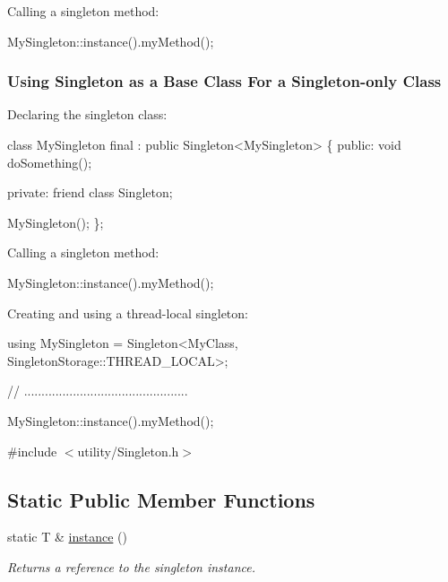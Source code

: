 Calling a singleton method\+: 
\begin{DoxyCode}
MySingleton::instance().myMethod();
\end{DoxyCode}
\hypertarget{classdg_1_1deepcore_1_1_singleton_inherit}{}\subsubsection{Using Singleton as a Base Class For a Singleton-\/only Class}\label{classdg_1_1deepcore_1_1_singleton_inherit}
Declaring the singleton class\+: 
\begin{DoxyCode}
\textcolor{keyword}{class }MySingleton final : \textcolor{keyword}{public} Singleton<MySingleton>
\{
\textcolor{keyword}{public}:
    \textcolor{keywordtype}{void} doSomething();

\textcolor{keyword}{private}:
    \textcolor{keyword}{friend} \textcolor{keyword}{class }Singleton;

    MySingleton();
\};
\end{DoxyCode}


Calling a singleton method\+: 
\begin{DoxyCode}
MySingleton::instance().myMethod();
\end{DoxyCode}


Creating and using a thread-\/local singleton\+: 
\begin{DoxyCode}
\textcolor{keyword}{using} MySingleton = Singleton<MyClass, SingletonStorage::THREAD\_LOCAL>;

\textcolor{comment}{// ...............................................}

MySingleton::instance().myMethod();
\end{DoxyCode}
 

{\ttfamily \#include $<$utility/\+Singleton.\+h$>$}

\subsection*{Static Public Member Functions}
\begin{DoxyCompactItemize}
\item 
static T \& \hyperlink{classdg_1_1deepcore_1_1_singleton_ae2afab347dcad17600266e99999d0007}{instance} ()
\begin{DoxyCompactList}\small\item\em Returns a reference to the singleton instance. \end{DoxyCompactList}\end{DoxyCompactItemize}


